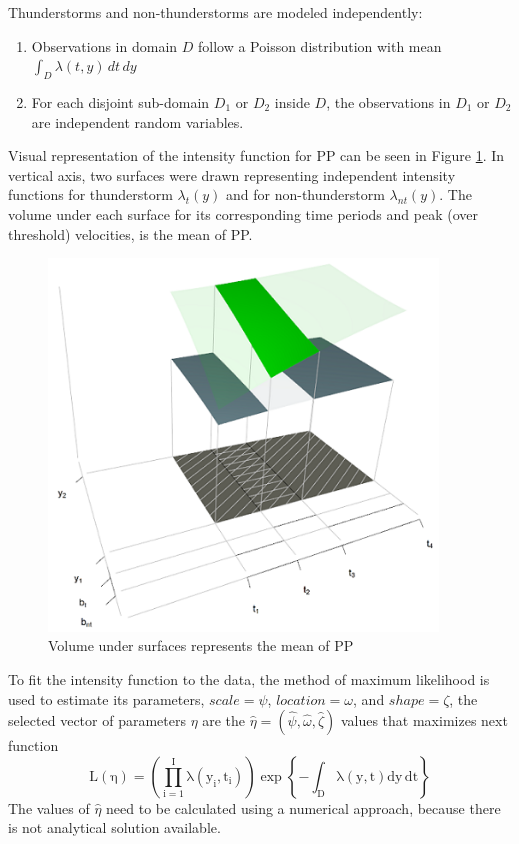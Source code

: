 \documentclass[12pt,oneside]{reedthesis}
\providecommand{\tightlist}{%
  \setlength{\itemsep}{0pt}\setlength{\parskip}{0pt}}
\begin{document}
Thunderstorms and non-thunderstorms are modeled independently:
\begin{enumerate}
\def\labelenumi{\arabic{enumi}.}
\tightlist
\item
  Observations in domain \(D\) follow a Poisson distribution with mean \(\int_D\lambda(t,y)\,dt\,dy\)
\item
  For each disjoint sub-domain \(D_1\) or \(D_2\) inside \(D\), the observations in \(D_1\) or \(D_2\) are independent random variables.
\end{enumerate}
Visual representation of the intensity function for PP can be seen in Figure \ref{fig:plotdomain3dpp}. In vertical axis, two surfaces were drawn representing independent intensity functions for thunderstorm \(\lambda_t(y)\) and for non-thunderstorm \(\lambda_{nt}(y)\). The volume under each surface for its corresponding time periods and peak (over threshold) velocities, is the mean of PP.
\begin{figure}

{\centering \includegraphics[width=4.07in]{figure/domain3d} 

}

\caption{Volume under surfaces represents the mean of PP}\label{fig:plotdomain3dpp}
\end{figure}
To fit the intensity function to the data, the method of maximum likelihood is used to estimate its parameters, \(scale = \psi\), \(location = \omega\), and \(shape = \zeta\), the selected vector of parameters \(\eta\) are the \(\hat\eta = (\hat\psi, \hat\omega, \hat\zeta)\) values that maximizes next function
\begin{equation}
  \mathrm{
          L(\eta)=\left( 
                        \prod_{i=1}^I\lambda\left(y_i,t_i\right)  
                  \right)
                  \exp\left\{
                            -\int_{{D}}\lambda\left(y,t\right)dy\,dt
                     \right\}
         }
  \label{eq:pplikelihood}
\end{equation}
The values of \(\hat\eta\) need to be calculated using a numerical approach, because there is not analytical solution available.
\end{document}
